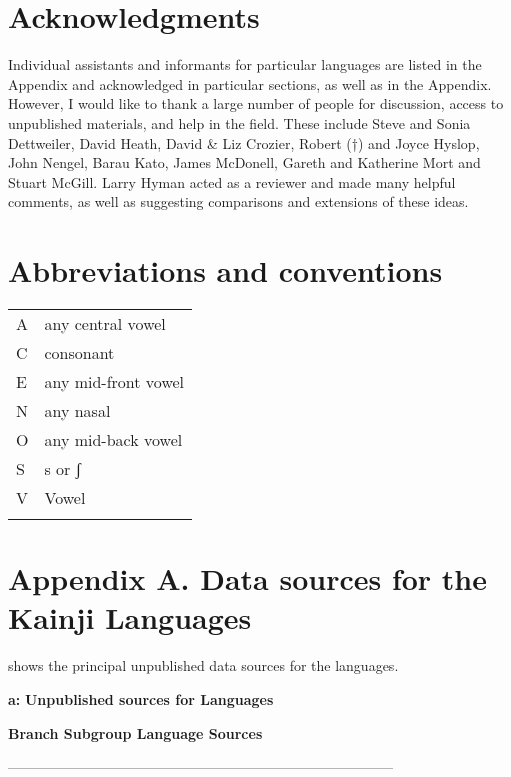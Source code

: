 \documentclass[output=paper]{langsci/langscibook}
\begin{document}
\section{Acknowledgments}

Individual assistants and informants for particular languages are listed in the Appendix and acknowledged in particular sections, as well as in the Appendix. However, I would like to thank a large number of people for discussion, access to unpublished materials, and help in the field. These include Steve and Sonia Dettweiler, David Heath, David \& Liz Crozier, Robert (†) and Joyce Hyslop, John Nengel, Barau Kato, James McDonell, Gareth and Katherine Mort and Stuart McGill. Larry Hyman acted as a reviewer and made many helpful comments, as well as suggesting comparisons and extensions of these ideas.

\section{Abbreviations and conventions}

\begin{tabularx}{\textwidth}{lQ}
\lsptoprule
A & any central vowel\\
C & consonant\\
E & any mid-front vowel\\
N & any nasal\\
O & any mid-back vowel\\
S & s or ʃ\\
V & Vowel\\
\lspbottomrule
\end{tabularx}

\section{Appendix A. Data sources for the Kainji Languages}

 shows the principal unpublished data sources for the  languages.

\textbf{a:} \textbf{Unpublished sources for  Languages}

\textbf{Branch  Subgroup  Language    Sources}

———————————————————————————–
\end{document}
